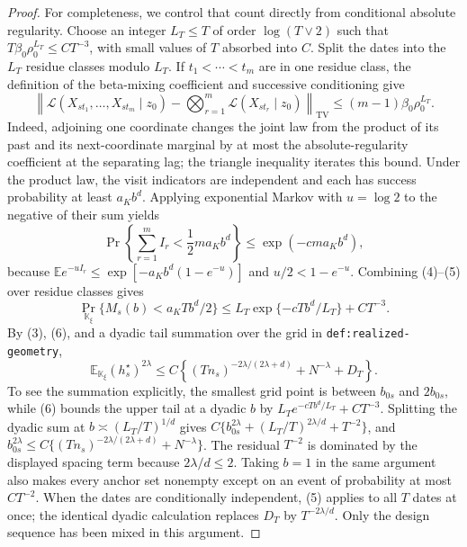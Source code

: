 \documentclass{article}
\begin{document}
\begin{proof}
For completeness, we control that count directly from conditional absolute
regularity.  Choose an integer
\(L_T\le T\) of order \(\log(T\vee2)\) such that
\(T\beta_0\rho_0^{L_T}\le CT^{-3}\), with small values of \(T\) absorbed
into \(C\).  Split the dates into the \(L_T\) residue classes modulo
\(L_T\).  If \(t_1<\cdots<t_m\) are in one residue class, the definition of
the beta-mixing coefficient and successive conditioning give
\[
 \left\|\mathcal L(X_{st_1},\ldots,X_{st_m}\mid z_0)
 -\bigotimes_{r=1}^{m}\mathcal L(X_{st_r}\mid z_0)
 \right\|_{\mathrm{TV}}
 \le(m-1)\beta_0\rho_0^{L_T}.                                \tag{4}
\]
Indeed, adjoining one coordinate changes the joint law from the product of
its past and its next-coordinate marginal by at most the absolute-regularity
coefficient at the separating lag; the triangle inequality iterates this
bound.  Under the product law, the visit indicators are independent and
each has success probability at least \(a_Kb^d\).  Applying exponential
Markov with \(u=\log2\) to the negative of their sum yields
\[
 \Pr\left\{\sum_{r=1}^{m}I_r<\frac12ma_Kb^d\right\}
 \le \exp(-cma_Kb^d),                                        \tag{5}
\]
because
\(\mathbb E e^{-uI_r}\le
 \exp[-a_Kb^d(1-e^{-u})]\) and
\(u/2<1-e^{-u}\).  Combining (4)--(5) over residue classes gives
\[
 \Pr_{\mathbb K_\xi}
 \{M_s(b)<a_KTb^d/2\}
 \le L_T\exp\{-cTb^d/L_T\}+CT^{-3}.                         \tag{6}
\]
By (3), (6), and a dyadic tail summation over the grid in
\texttt{def:realized-geometry},
\[
 \mathbb E_{\mathbb K_\xi}(h_s^\star)^{2\lambda}
 \le C\left\{
 (Tn_s)^{-2\lambda/(2\lambda+d)}+N^{-\lambda}+D_T
 \right\}.                                                    \tag{7}
\]
To see the summation explicitly, the smallest grid point is between
\(b_{0s}\) and \(2b_{0s}\), while (6) bounds the upper tail at a dyadic
\(b\) by \(L_Te^{-cTb^d/L_T}+CT^{-3}\).  Splitting the dyadic sum at
\(b\asymp(L_T/T)^{1/d}\) gives
\(C\{b_{0s}^{2\lambda}+(L_T/T)^{2\lambda/d}+T^{-2}\}\), and
\(b_{0s}^{2\lambda}\le
C\{(Tn_s)^{-2\lambda/(2\lambda+d)}+N^{-\lambda}\}\).
The residual \(T^{-2}\) is dominated by the displayed spacing term because
\(2\lambda/d\le2\).  Taking \(b=1\) in the same argument also makes every
anchor set nonempty except on an event of probability at most \(CT^{-2}\).
When the dates are conditionally independent, (5) applies to all \(T\)
dates at once; the identical dyadic calculation replaces \(D_T\) by
\(T^{-2\lambda/d}\).  Only the design sequence has been mixed in this
argument.


\end{proof}
\end{document}
